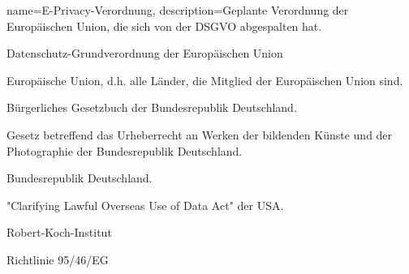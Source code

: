 {
    name={E-Privacy-Verordnung},
    description={Geplante Verordnung der Europäischen Union, die sich von der DSGVO abgespalten hat.}
}

{
    Datenschutz-Grundverordnung der Europäischen Union
}

{  
    Europäische Union, d.h. alle Länder, die Mitglied der Europäischen Union sind.
}

{
    Bürgerliches Gesetzbuch der Bundesrepublik Deutschland.
}

{
    Gesetz betreffend das Urheberrecht an Werken der bildenden Künste und der Photographie der Bundesrepublik Deutschland.
}

{
    Bundesrepublik Deutschland.
}

{
    "Clarifying Lawful Overseas Use of Data Act" der USA.
}

{
    Robert-Koch-Institut
}

{
    Richtlinie 95/46/EG
}
